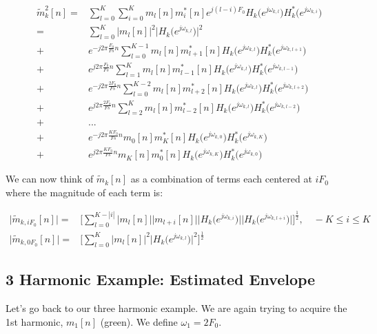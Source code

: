 \documentclass [11pt, proquest] {uwthesis}[2015/03/03]
\begin{document}
\begin{align}
\tilde{m}_k^2[n] =& \sum\limits_{l=0}^K \sum\limits_{i=0}^K m_l[n] m_i^*[n] e^{j(l-i)F_0} H_k\big(e^{j\omega_{k,l}}\big)H_k^*\big(e^{j\omega_{k,i}}\big) \\
%
%
%
=& \sum\limits_{l=0}^K \Big|m_l[n]\Big|^2 \Big|H_k\big(e^{j\omega_{k,l}}\big)\Big|^2 \nonumber \\
%
%
+& e^{-j2\pi \frac{F_0}{Fs}n} \sum\limits_{l=0}^{K-1} m_l[n] m_{l+1}^*[n] H_k\big(e^{j\omega_{k,l}}\big)H_k^*\big(e^{j\omega_{k,l+1}}\big) \nonumber \\
%
+&  e^{j2\pi \frac{F_0}{Fs}n} \sum\limits_{l=1}^{K} m_l[n] m_{l-1}^*[n] H_k\big(e^{j\omega_{k,l}}\big)H_k^*\big(e^{j\omega_{k,l-1}}\big) \nonumber \\
%
%
+& e^{-j2\pi \frac{2F_0}{Fs}n} \sum\limits_{l=0}^{K-2} m_l[n] m_{l+2}^*[n] H_k\big(e^{j\omega_{k,l}}\big)H_k^*\big(e^{j\omega_{k,l+2}}\big) \nonumber \\
%
+& e^{j2\pi \frac{2F_0}{Fs}n}  \sum\limits_{l=2}^{K} m_l[n] m_{l-2}^*[n] H_k\big(e^{j\omega_{k,l}}\big)H_k^*\big(e^{j\omega_{k,l-2}}\big) \nonumber \\
%
%
+& ... \nonumber \\
%
%
+& e^{-j2\pi \frac{KF_0}{Fs}n} m_0[n] m_K^*[n] H_k\big(e^{j\omega_{k,0}}\big)H_k^*\big(e^{j\omega_{k,K}}\big) \nonumber \\
%
+& e^{j2\pi \frac{KF_0}{Fs}n}  m_K[n] m_0^*[n] H_k\big(e^{j\omega_{k,K}}\big)H_k^*\big(e^{j\omega_{k,0}}\big)
\end{align}

We can now think of $\tilde{m}_k[n]$ as a combination of terms each centered at $iF_0$ where the magnitude of each term is:

\begin{align}
\Big| \tilde{m}_{k,iF_0}[n] \Big| =& \Bigg[ \sum\limits_{l=0}^{K-|i|} \Big| m_l[n]\Big| \Big|m_{l+i}[n]\Big| \Big|H_k\big(e^{j\omega_{k,i}}\big)\Big| \Big|H_k\big(e^{j\omega_{k,l+i}}\big)\Big|\Bigg]^\frac{1}{2}, \quad -K \leq i \leq K \\
%
\Big| \tilde{m}_{k,0F_0}[n] \Big| =& \Bigg[  \sum\limits_{l=0}^K \Big|m_l[n]\Big|^2 \Big|H_k\big(e^{j\omega_{k,l}}\big)\Big|^2 \Bigg]^\frac{1}{2}
\end{align}

\subsection{3 Harmonic Example: Estimated Envelope}

Let's go back to our three harmonic example.  We are again trying to acquire the 1st harmonic, $m_1[n]$ (green).  We define $\omega_1 = 2F_0$.
\end{document}
